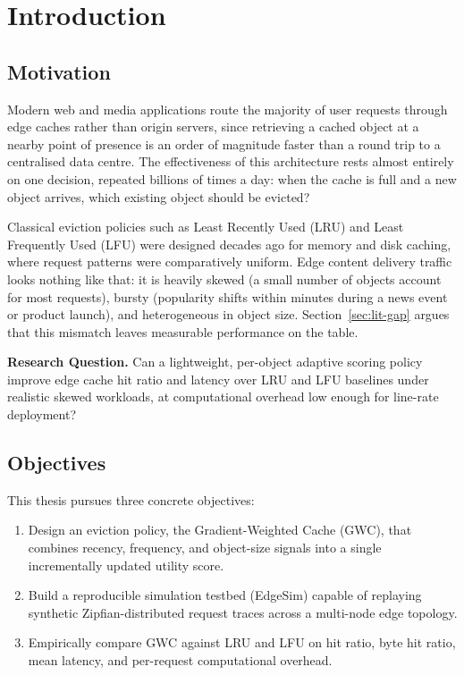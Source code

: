 \chapter{Introduction}
\label{ch:introduction}

\section{Motivation}
Modern web and media applications route the majority of user requests through edge caches
rather than origin servers, since retrieving a cached object at a nearby point of presence is
an order of magnitude faster than a round trip to a centralised data centre. The effectiveness
of this architecture rests almost entirely on one decision, repeated billions of times a day:
when the cache is full and a new object arrives, which existing object should be evicted?

Classical eviction policies such as Least Recently Used (LRU) and Least Frequently Used (LFU)
were designed decades ago for memory and disk caching, where request patterns were comparatively
uniform. Edge content delivery traffic looks nothing like that: it is heavily skewed (a small
number of objects account for most requests), bursty (popularity shifts within minutes during
a news event or product launch), and heterogeneous in object size. Section~\ref{sec:lit-gap}
argues that this mismatch leaves measurable performance on the table.

\begin{researchquestion}
\textbf{Research Question.} Can a lightweight, per-object adaptive scoring policy improve edge
cache hit ratio and latency over LRU and LFU baselines under realistic skewed workloads, at
computational overhead low enough for line-rate deployment?
\end{researchquestion}

\section{Objectives}
This thesis pursues three concrete objectives:
\begin{enumerate}
  \item Design an eviction policy, the Gradient-Weighted Cache (GWC), that combines recency,
        frequency, and object-size signals into a single incrementally updated utility score.
  \item Build a reproducible simulation testbed (EdgeSim) capable of replaying synthetic
        Zipfian-distributed request traces across a multi-node edge topology.
  \item Empirically compare GWC against LRU and LFU on hit ratio, byte hit ratio, mean
        latency, and per-request computational overhead.
\end{enumerate}

